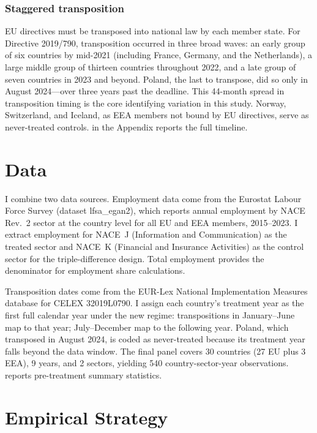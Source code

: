 \documentclass[12pt]{article}
\begin{document}
\subsubsection*{Staggered transposition}  EU directives must be transposed into national law by each member state. For Directive 2019/790, transposition occurred in three broad waves: an early group of six countries by mid-2021 (including France, Germany, and the Netherlands), a large middle group of thirteen countries throughout 2022, and a late group of seven countries in 2023 and beyond. Poland, the last to transpose, did so only in August 2024---over three years past the deadline. This 44-month spread in transposition timing is the core identifying variation in this study. Norway, Switzerland, and Iceland, as EEA members not bound by EU directives, serve as never-treated controls.  in the Appendix reports the full timeline.

\section{Data}

I combine two data sources. Employment data come from the Eurostat Labour Force Survey (dataset lfsa\_egan2), which reports annual employment by NACE Rev.~2 sector at the country level for all EU and EEA members, 2015--2023. I extract employment for NACE~J (Information and Communication) as the treated sector and NACE~K (Financial and Insurance Activities) as the control sector for the triple-difference design. Total employment provides the denominator for employment share calculations.

Transposition dates come from the EUR-Lex National Implementation Measures database for CELEX 32019L0790. I assign each country's treatment year as the first full calendar year under the new regime: transpositions in January--June map to that year; July--December map to the following year. Poland, which transposed in August 2024, is coded as never-treated because its treatment year falls beyond the data window. The final panel covers 30 countries (27 EU plus 3 EEA), 9 years, and 2 sectors, yielding 540 country-sector-year observations.  reports pre-treatment summary statistics.



\section{Empirical Strategy}
\end{document}
